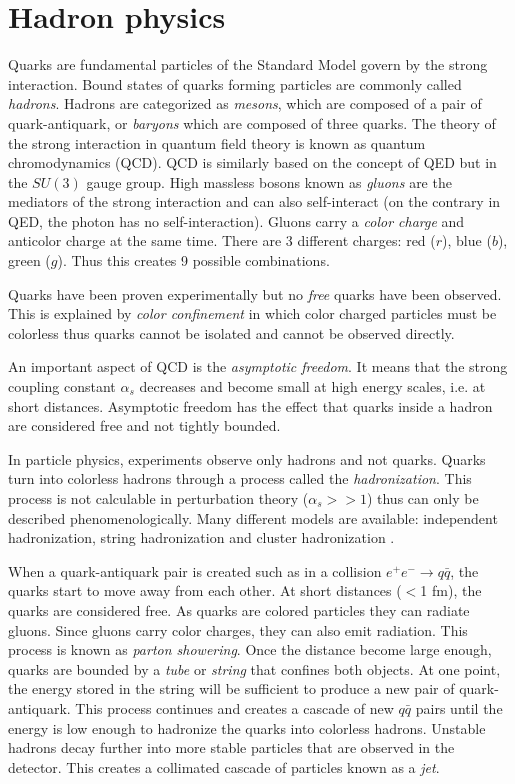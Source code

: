 \section{Hadron physics}

Quarks are fundamental particles of the Standard Model govern by the strong interaction. Bound states of quarks forming particles are commonly called \textit{hadrons}. Hadrons are categorized as \textit{mesons}, which are composed of a pair of quark-antiquark, or \textit{baryons} which are composed of three quarks. The theory of the strong interaction in quantum field theory is known as quantum chromodynamics (QCD). QCD is similarly based on the concept of QED but in the $SU(3)$ gauge group. High massless bosons known as \textit{gluons} are the mediators of the strong interaction and can also self-interact (on the contrary in QED, the photon has no self-interaction). Gluons carry a \textit{color charge} and anticolor charge at the same time. There are 3 different charges: red ($r$), blue ($b$), green ($g$). Thus this creates 9 possible combinations.

Quarks have been proven experimentally but no \textit{free} quarks have been observed. This is explained by \textit{color confinement} in which color charged particles must be colorless thus quarks cannot be isolated and cannot be observed directly.

An important aspect of QCD is the \textit{asymptotic freedom}. It means that the strong coupling constant $\alpha_s$ decreases and become small at high energy scales, i.e. at short distances. Asymptotic freedom has the effect that quarks inside a hadron are considered free and not tightly bounded.

In particle physics, experiments observe only hadrons and not quarks. Quarks turn into colorless hadrons through a process called the \textit{hadronization}. This process is not calculable in perturbation theory ($\alpha_s >> 1$) thus can only be described phenomenologically. Many different models are available: independent hadronization, string hadronization \cite{Artru1988} and cluster hadronization \cite{Webber:1983if}.

When a quark-antiquark pair is created such as in a collision $e^+e^- \rightarrow q\bar{q}$, the quarks start to move away from each other. At short distances ($<$1 fm), the quarks are considered free. As quarks are colored particles they can radiate gluons. Since gluons carry color charges, they can also emit radiation. This process is known as \textit{parton showering}. Once the distance become large enough, quarks are bounded by a \textit{tube} or \textit{string} that confines both objects. At one point, the energy stored in the string will be sufficient to produce a new pair of quark-antiquark. This process continues and creates a cascade of new $q\bar{q}$ pairs until the energy is low enough to hadronize the quarks into colorless hadrons. Unstable hadrons decay further into more stable particles that are observed in the detector. This creates a collimated cascade of particles known as a \textit{jet}.

